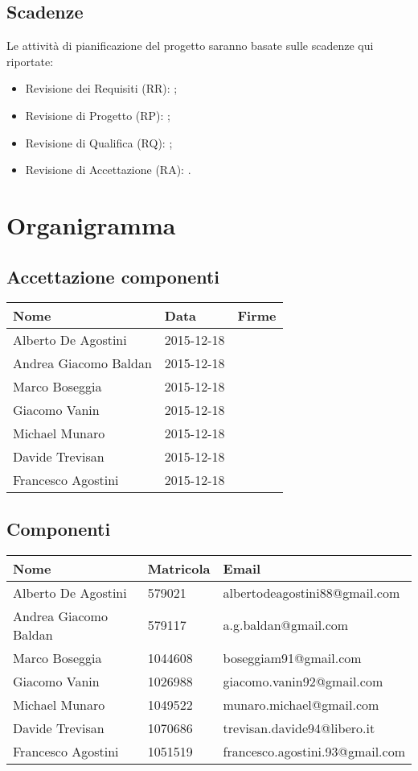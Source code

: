 \documentclass{scalatekids-article}
\begin{document}
\subsection{Scadenze}
Le attività di pianificazione del progetto saranno basate sulle scadenze qui riportate:
\begin{itemize}
\item {Revisione dei Requisiti (RR): ;}
\item {Revisione di Progetto (RP): ;}
\item {Revisione di Qualifica (RQ): ;}
\item {Revisione di Accettazione (RA): .}
\end{itemize}
\section{Organigramma}
\subsection{Accettazione componenti}
\begin{center}
  \begin{tabular}{|l | l | p{4cm} |}
    \hline
    Nome & Data & Firme \\
    \hline
    Alberto De Agostini & 2015-12-18 &\\
    Andrea Giacomo Baldan & 2015-12-18 &\\
    Marco Boseggia & 2015-12-18 &\\
    Giacomo Vanin & 2015-12-18 &\\
    Michael Munaro & 2015-12-18 &\\
    Davide Trevisan & 2015-12-18 &\\
    Francesco Agostini & 2015-12-18 &\\
    \hline
  \end{tabular}
\end{center}
\subsection{Componenti}
\begin{center}
  \begin{tabular}{|l | l | l |}
    \hline
    Nome & Matricola & Email \\
    \hline
    Alberto De Agostini & 579021 & albertodeagostini88@gmail.com\\
    Andrea Giacomo Baldan & 579117 & a.g.baldan@gmail.com\\
    Marco Boseggia & 1044608 & boseggiam91@gmail.com\\
    Giacomo Vanin & 1026988 & giacomo.vanin92@gmail.com\\
    Michael Munaro & 1049522 & munaro.michael@gmail.com\\
    Davide Trevisan & 1070686 & trevisan.davide94@libero.it\\
    Francesco Agostini & 1051519 & francesco.agostini.93@gmail.com\\
    \hline
  \end{tabular}
\end{center}
\end{document}
